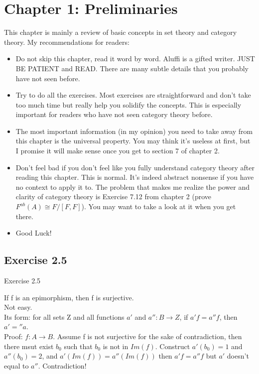 \documentclass[15pt]{scrartcl}
\begin{document}
\section{Chapter 1: Preliminaries}
    This chapter is mainly a review of basic concepts in set theory and category theory. My recommendations for readers: 
\begin{itemize}
    \item Do not skip this chapter, read it word by word. Aluffi is a gifted writer. JUST BE PATIENT and READ. There are many subtle details that you probably have not seen before. 
    \item Try to do all the exercises. Most exercises are straightforward and don't take too much time but really help you solidify the concepts. This is especially important for readers who have not seen category theory before.
    \item The most important information (in my opinion) you need to take away from this chapter is the universal property. You may think it's useless at first, but I promise it will make sense once you get to section 7 of chapter 2. 
    \item Don't feel bad if you don't feel like you fully understand category theory after reading this chapter. This is normal. It's indeed abstract nonsense if you have no context to apply it to. The problem that makes me realize the power and clarity of category theory is Exercise 7.12 from chapter 2 (prove $F^{ab}(A)\cong F/[F,F]$). You may want to take a look at it when you get there. 
    \item Good Luck!
\end{itemize}



\subsection{Exercise 2.5}
\begin{discussion*} Exercise 2.5
    \begin{abboy*}
        If f is an epimorphism, then f is surjective. 
        \\
        Not easy. 
        \\
        Its form: for all sets Z and all functions $a'$ and $a'': B\to Z$, if $a'f=a''f$, then $a'=''a$. 
        \\
        Proof: $f: A\to B$. Assume f is not surjective for the sake of contradiction, then  there msut exist $b_0$ such that $b_0$ is not in $Im(f)$. Construct $a'(b_0)=1$ and $a''(b_0)=2$, and $a'(Im(f))=a''(Im(f))$ then $a'f=a''f$ but $a'$ doesn't equal to $a''$. Contradiction!
    \end{abboy*}
\end{discussion*}
\end{document}

